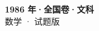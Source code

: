 \documentclass[zihao=-4, a4paper]{ctexart}
\begin{document}
\begin{center}
  {\Large\bfseries 1986 年·全国卷·文科}\\[4pt]
  {\large 数学 · 试题版}
\end{center}
\medskip
{}

\end{document}
